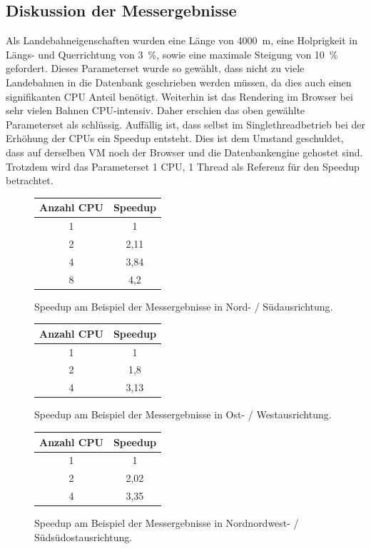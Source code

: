 \documentclass[10pt,a4paper]{report}
\begin{document}
\subsection{Diskussion der Messergebnisse}

Als Landebahneigenschaften wurden eine Länge von 4000~m, eine Holprigkeit in Längs- und Querrichtung von 3~\%, sowie eine maximale Steigung von 10~\% gefordert. Dieses Parameterset wurde so gewählt, dass nicht zu viele Landebahnen in die Datenbank geschrieben werden müssen, da dies auch einen signifikanten CPU Anteil benötigt. Weiterhin ist das Rendering im Browser bei sehr vielen Bahnen CPU-intensiv. Daher erschien das oben gewählte Parameterset als schlüssig.
Auffällig ist, dass selbst im Singlethreadbetrieb bei der Erhöhung der CPUs ein Speedup entsteht. Dies ist dem Umstand geschuldet, dass auf derselben VM noch der Browser und die Datenbankengine gehostet sind.
Trotzdem wird das Parameterset 1 CPU, 1 Thread als Referenz für den Speedup betrachtet.

\begin{figure}
\begin{tabular}{|c|c|}
 \hline 
 Anzahl CPU & Speedup \\ 
 \hline 
 1 & 1 \\ 
 \hline 
 2 & 2,11 \\ 
 \hline 
 4 & 3,84 \\ 
 \hline 
  8 & 4,2 \\ 
 \hline 
 \end{tabular}  
 \caption{Speedup am Beispiel der Messergebnisse in Nord- / Südausrichtung.}
\end{figure}

\begin{figure}
\begin{tabular}{|c|c|}
 \hline 
 Anzahl CPU & Speedup \\ 
 \hline 
 1 & 1 \\ 
 \hline 
 2 & 1,8 \\ 
 \hline 
 4 & 3,13 \\ 
 \hline 
 \end{tabular}  
 \caption{Speedup am Beispiel der Messergebnisse in Ost- / Westausrichtung.}
\end{figure}

\begin{figure}
\begin{tabular}{|c|c|}
 \hline 
 Anzahl CPU & Speedup \\ 
 \hline 
 1 & 1 \\ 
 \hline 
 2 & 2,02 \\ 
 \hline 
 4 & 3,35 \\ 
 \hline 
 \end{tabular}  
 \caption{Speedup am Beispiel der Messergebnisse in Nordnordwest- / Südsüdostausrichtung.}
\end{figure}
\end{document}
